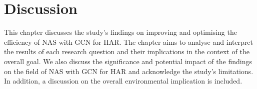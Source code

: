 \chapter{Discussion}\label{discussion}
This chapter discusses the study's findings on improving and optimising the efficiency of \gls{NAS} with \gls{GCN} for \gls{HAR}. The chapter aims to analyse and interpret the results of each research question and their implications in the context of the overall goal. We also discuss the significance and potential impact of the findings on the field of \gls{NAS} with \gls{GCN} for \gls{HAR} and acknowledge the study's limitations. In addition, a discussion on the overall environmental implication is included. 


%


